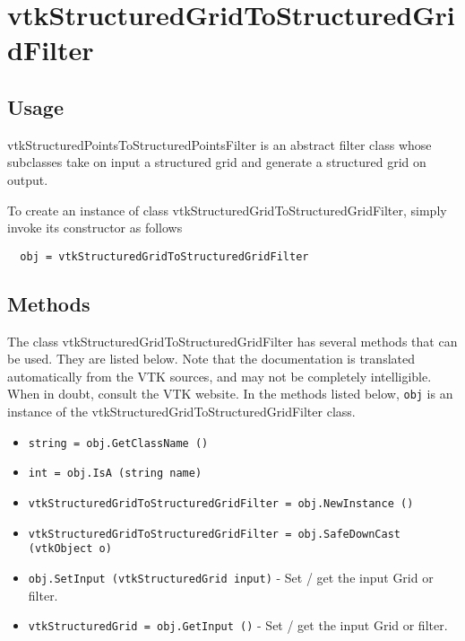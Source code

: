 \section{vtkStructuredGridToStructuredGridFilter}

\subsection{Usage}

 vtkStructuredPointsToStructuredPointsFilter is an abstract filter class 
 whose subclasses take on input a structured grid  and generate a
 structured grid on output.

To create an instance of class vtkStructuredGridToStructuredGridFilter, simply
invoke its constructor as follows
\begin{verbatim}
  obj = vtkStructuredGridToStructuredGridFilter
\end{verbatim}
\subsection{Methods}

The class vtkStructuredGridToStructuredGridFilter has several methods that can be used.
  They are listed below.
Note that the documentation is translated automatically from the VTK sources,
and may not be completely intelligible.  When in doubt, consult the VTK website.
In the methods listed below, \verb|obj| is an instance of the vtkStructuredGridToStructuredGridFilter class.
\begin{itemize}
\item  \verb|string = obj.GetClassName ()|

\item  \verb|int = obj.IsA (string name)|

\item  \verb|vtkStructuredGridToStructuredGridFilter = obj.NewInstance ()|

\item  \verb|vtkStructuredGridToStructuredGridFilter = obj.SafeDownCast (vtkObject o)|

\item  \verb|obj.SetInput (vtkStructuredGrid input)| -  Set / get the input Grid or filter.

\item  \verb|vtkStructuredGrid = obj.GetInput ()| -  Set / get the input Grid or filter.

\end{itemize}
